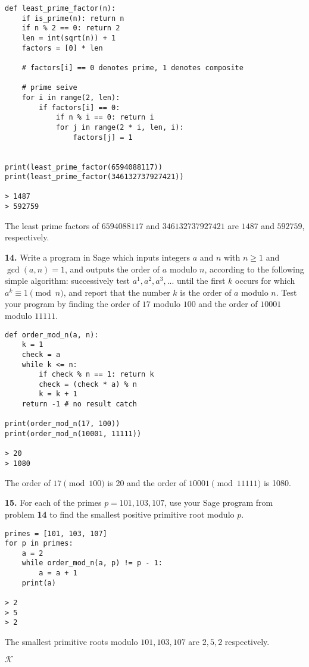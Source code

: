 \documentclass[12pt]{amsart}
\begin{document}
\begin{verbatim}
def least_prime_factor(n):
    if is_prime(n): return n
    if n % 2 == 0: return 2
    len = int(sqrt(n)) + 1
    factors = [0] * len

    # factors[i] == 0 denotes prime, 1 denotes composite

    # prime seive
    for i in range(2, len):
        if factors[i] == 0:
            if n % i == 0: return i
            for j in range(2 * i, len, i):
                factors[j] = 1


print(least_prime_factor(6594088117))
print(least_prime_factor(346132737927421))

> 1487
> 592759
\end{verbatim}

\medskip

The least prime factors of $6594088117$ and $346132737927421$ are $1487$ and $592759$, respectively. 

\newpage

{\bf 14.}  Write a program in Sage which inputs integers $a$ and $n$ with $n\geq1$ and $\gcd(a,n)=1$, and outputs the order of $a$ modulo $n$, according to the following simple algorithm: successively test $a^1, a^2, a^3,...$ until the first $k$ occurs for which $a^k \equiv1\pmod{n}$, and report that the number $k$ is the order of $a$ modulo $n$.  Test your program by finding the order of $17$ modulo $100$ and the order of $10001$ modulo $11111$.

\medskip

\begin{verbatim}
def order_mod_n(a, n):
    k = 1
    check = a
    while k <= n:
        if check % n == 1: return k
        check = (check * a) % n
        k = k + 1
    return -1 # no result catch
        
print(order_mod_n(17, 100))
print(order_mod_n(10001, 11111))

> 20
> 1080
\end{verbatim}

\smallskip

The order of $17\pmod{100}$ is 20 and the order of $10001\pmod{11111}$ is 1080.

\medskip

{\bf 15.}  For each of the primes $p=101,103,107$, use your Sage program from problem {\bf 14} to find the smallest positive primitive root modulo $p$.

\medskip

\begin{verbatim}
primes = [101, 103, 107]
for p in primes:
    a = 2
    while order_mod_n(a, p) != p - 1:
        a = a + 1
    print(a)

> 2
> 5
> 2
\end{verbatim}

The smallest primitive roots modulo $101, 103, 107$ are $2, 5, 2$ respectively. 

$\mathcal{K}$
\end{document}
